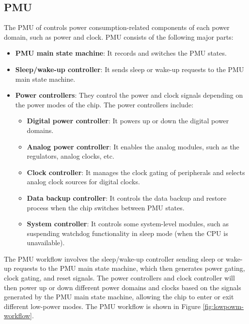 \documentclass[main\_\_EN.tex]{subfiles}
\begin{document}
\subsection{PMU}

The PMU of \chipname{} controls power consumption-related components of each power domain, such as power and clock. PMU consists of the following major parts:

\begin{itemize}
    \item \textbf{PMU main state machine}: It records and switches the PMU states.
    \item \textbf{Sleep/wake-up controller}: It sends sleep or wake-up requests to the PMU main state machine.
    \item \textbf{Power controllers}: They control the power and clock signals depending on the power modes of the chip. The power controllers include:
        \begin{itemize}
            \item \textbf{Digital power controller}: It powers up or down the digital power domains.
            \item \textbf{Analog power controller}: It enables the analog modules, such as the regulators, analog clocks, etc.
            \item \textbf{Clock controller}: It manages the clock gating of peripherals and selects analog clock sources for digital clocks.
            \item \textbf{Data backup controller}: It controls the data backup and restore process when the chip switches between PMU states.

            \item \textbf{System controller}: It controls some system-level modules, such as suspending watchdog functionality in sleep mode (when the CPU is unavailable).
        \end{itemize}
\end{itemize}

The PMU workflow involves the sleep/wake-up controller sending sleep or wake-up requests to the PMU main state machine, which then generates power gating, clock gating, and reset signals. The power controllers and clock controller will then power up or down different power domains and clocks based on the signals generated by the PMU main state machine, allowing the chip to enter or exit different low-power modes. The PMU workflow is shown in Figure \ref{fig:lowpowm-workflow}.
\end{document}
